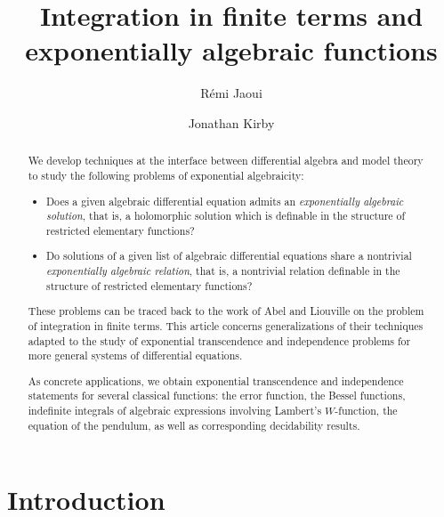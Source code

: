 \documentclass[12pt]{amsart}
\title{Integration in finite terms and exponentially algebraic functions}
\author{Rémi Jaoui}
\author{Jonathan Kirby}
\theoremstyle{definition}
\theoremstyle{plain}
\theoremstyle{exampstyle}\newtheorem{thmx}{Theorem}
\theoremstyle{exampstyle}\newtheorem{thmxbis}{Theorem}
\begin{document}
\maketitle
\begin{abstract}
We develop techniques at the interface between differential algebra and model theory to study the following problems of exponential algebraicity:
\begin{itemize}
\item[(1)] Does a given algebraic differential equation admits an {\em exponentially algebraic solution}, that is, a holomorphic solution which is definable in the structure of restricted elementary functions?
\item[(2)] Do solutions of a given list of algebraic differential equations share a nontrivial {\em exponentially algebraic relation}, that is, a nontrivial relation definable in the structure of restricted elementary functions?
\end{itemize}
These problems can be traced back to the work of Abel and Liouville on the problem of integration in finite terms. This article concerns generalizations of their techniques adapted to the study of exponential transcendence and independence problems for  more general systems of differential equations. 

As concrete applications, we obtain exponential transcendence and independence statements for several classical functions: the error function, the Bessel functions, indefinite integrals of algebraic expressions involving Lambert's $W$-function, the equation of the pendulum, as well as  corresponding decidability results.
\end{abstract}
 \setcounter{tocdepth}{1}

\tableofcontents

\section{Introduction}
\end{document}
